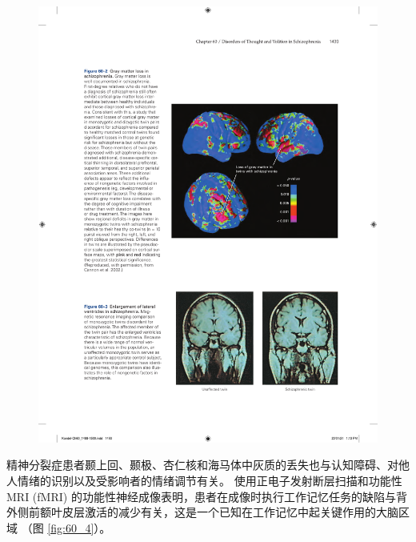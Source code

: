 \begin{figure}[htbp]
	\centering
	\includegraphics[width=0.7\linewidth]{chap60/fig_60_3}
	\caption{}
	\label{fig:60_3}
\end{figure}

精神分裂症患者颞上回、颞极、杏仁核和海马体中灰质的丢失也与认知障碍、对他人情绪的识别以及受影响者的情绪调节有关。 使用正电子发射断层扫描和功能性 MRI (fMRI) 的功能性神经成像表明，患者在成像时执行工作记忆任务的缺陷与背外侧前额叶皮层激活的减少有关，这是一个已知在工作记忆中起关键作用的大脑区域 （图 \ref{fig:60_4}）。


